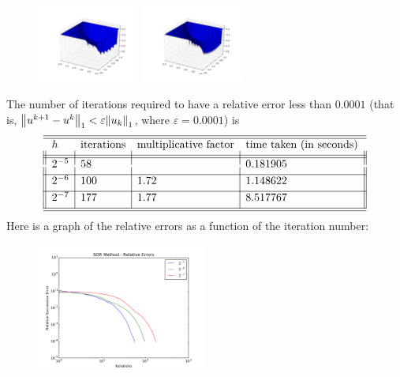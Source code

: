 \documentclass{article} %
\theoremstyle{plain}
\newcommand{\E}{\varepsilon}
\numberwithin{equation}{section} %
\numberwithin{figure}{section} %
\numberwithin{table}{section} %
\begin{document}
\begin{itemize}
\begin{figure}[ht!]
        \includegraphics[width=0.3\textwidth]{figure_1_sor_1.png}
        \includegraphics[width=0.3\textwidth]{figure_1_sor_2.png}
    \end{figure}
    \FloatBarrier
    The number of iterations required to have a relative error less than $0.0001$ (that is, $\norm{u^{k+1} - u^k}_1 < \E\norm{u_k}_1$, where $\E = 0.0001$) is
    \begin{align*}
        \begin{array}{||l|l|l|l||}\hline\hline
            h & \text{iterations} & \text{multiplicative factor} & \text{time taken (in seconds)} \\[.1cm]\hline\hline
            2^{-5} & 58 & & 0.181905 \\[.1cm]\hline
            2^{-6} & 100 & 1.72 & 1.148622 \\[.1cm]\hline
            2^{-7} & 177 & 1.77 & 8.517767 \\[.1cm]\hline\hline
        \end{array}
    \end{align*}
    Here is a graph of the relative errors as a function of the iteration number:
    \begin{figure}[ht!]
        \centering
        \includegraphics[width=0.5\textwidth]{figure_1_error_sor.png}
    \end{figure}
    \FloatBarrier
\end{itemize}
\end{document}
